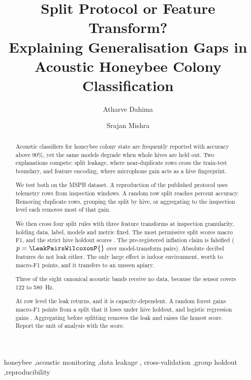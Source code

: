﻿\documentclass[review,12pt]{elsarticle}
\begin{document}
\begin{frontmatter}

\title{\textbf{Split Protocol or Feature Transform?\\
Explaining Generalisation Gaps in Acoustic Honeybee Colony Classification}}

\author[inst1]{Atharve Dahima}
\author[inst1]{Srajan Mishra}



\begin{abstract}
Acoustic classifiers for honeybee colony state are frequently reported with
accuracy above 90\%, yet the same models degrade when whole hives are held out.
Two explanations compete: split leakage, where near-duplicate rows cross the
train-test boundary, and feature encoding, where microphone gain acts as a hive
fingerprint.

We test both on the MSPB dataset.
A reproduction of the published protocol uses \LeakReproNRows{} telemetry rows
from \LeakReproNWindows{} inspection windows.
A random row split reaches \LeakReproBestAAccuracy{} percent accuracy.
Removing duplicate rows, grouping the split by hive, or aggregating to the
inspection level each removes most of that gain.

We then cross four split rules with three feature transforms at inspection
granularity, holding data, label, models and metric fixed.
The most permissive split scores \LeakBandsPzeroHistGradientBoostingMacroFone{}
macro F1, and the strict hive holdout scores
\LeakBandsPtwoHistGradientBoostingMacroFone{}.
The pre-registered inflation claim is falsified
($p = \LeakPairsWilcoxonP{}$ over \LeakPairsN{} model-transform pairs).
Absolute decibel features do not leak either.
The only large effect is indoor environment, worth \LeakEnvGainMinPts{} to
\LeakEnvGainMaxPts{} macro-F1 points, and it transfers to an unseen apiary.

Three of the eight canonical acoustic bands receive no data, because the sensor
covers \SI{122}{} to \SI{580}{\hertz}.

At row level the leak returns, and it is capacity-dependent.
A random forest gains \LeakRowsGapRandomForestPts{} macro-F1 points from a split
that it loses under hive holdout, and logistic regression gains
\LeakRowsGapLogisticRegressionPts{}.
Aggregating before splitting removes the leak and raises the honest score.
Report the unit of analysis with the score.
\end{abstract}

\begin{keyword}
honeybee \sep acoustic monitoring \sep data leakage \sep
cross-validation \sep group holdout \sep reproducibility
\end{keyword}

\end{frontmatter}
\end{document}
